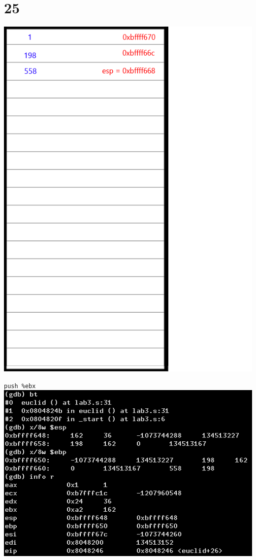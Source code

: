 \documentclass{article}
\begin{document}
\section*{25}
\begin{minipage}{5cm}
\includegraphics[scale=0.3]{s3.png}
\end{minipage}
\begin{minipage}{8cm}
\verb|push %ebx|\\
\includegraphics[scale=0.4]{bxi25.png} \\
\end{minipage}
\clearpage
\end{document}
